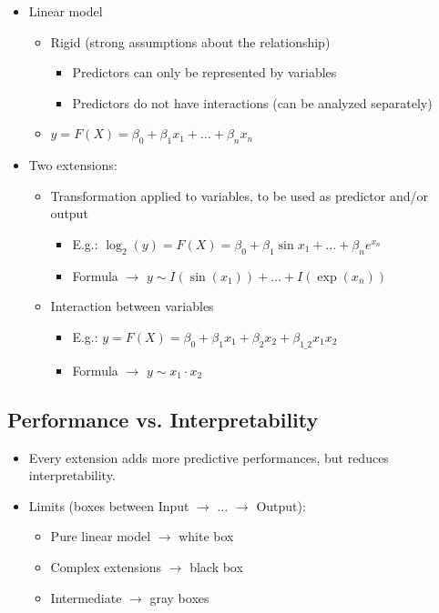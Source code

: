 \documentclass[a4paper]{article}
\begin{document}
		\begin{itemize}
			\item Linear model
				\begin{itemize}
					\item Rigid (strong assumptions about the relationship)
						\begin{itemize}
							\item Predictors can only be represented by variables
							\item Predictors do not have interactions (can be analyzed separately)
						\end{itemize}
					\item $y = F(X) = \beta_0 + \beta_1 x_1 + \dots + \beta_n x_n$
				\end{itemize}
			
			\item Two extensions:
				\begin{itemize}
					\item  Transformation applied to variables, to be used as predictor and/or output
						\begin{itemize}
							\item E.g.: $\log_2(y) = F(X) = \beta_0+ \beta_1 \sin x_1 + \dots + \beta_n e^{x_n}$
							\item Formula $\rightarrow$ $y \sim I(\sin(x_1)) + \dots + I(\exp(x_n))$
						\end{itemize}
					\item Interaction between variables
						\begin{itemize}
							\item E.g.: $y = F(X) = \beta_0 + \beta_1 x_1 + \beta_2 x_2 + \beta_{1\_2} x_1 x_2$
							\item Formula $\rightarrow$ $y \sim x_1 \cdot x_2$
						\end{itemize}
				\end{itemize}
		\end{itemize}
	
		\subsection{Performance vs. Interpretability}
		
		\begin{itemize}
			\item Every extension adds more predictive performances, but reduces interpretability.
			\item Limits (boxes between Input $\rightarrow$ $\dots$ $\rightarrow$ Output):
				\begin{itemize}
					\item Pure linear model $\rightarrow$ white box
					\item Complex extensions $\rightarrow$ black box
					\item Intermediate $\rightarrow$ gray boxes
				\end{itemize}
		\end{itemize}
	
\end{document}
